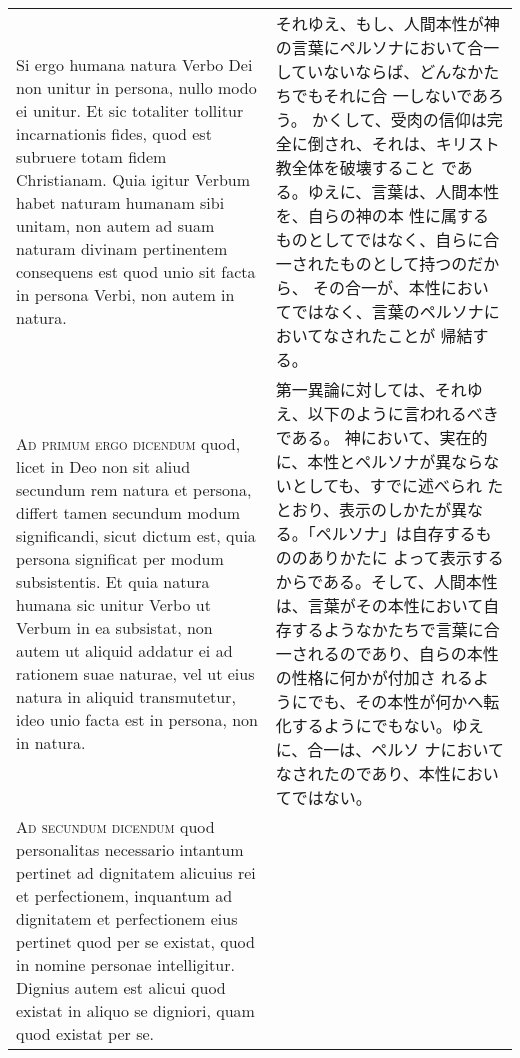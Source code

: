 \documentclass[10pt]{jsarticle} %
\begin{document}
\begin{longtable}{p{21em}p{21em}}
\\




Si ergo humana natura Verbo Dei non unitur in persona, nullo
modo ei unitur. 
Et sic totaliter tollitur incarnationis fides, quod est
subruere totam fidem Christianam. Quia igitur Verbum habet naturam
humanam sibi unitam, non autem ad suam naturam divinam pertinentem
consequens est quod unio sit facta in persona Verbi, non autem in
natura.


&

それゆえ、もし、人間本性が神
 の言葉にペルソナにおいて合一していないならば、どんなかたちでもそれに合
 一しないであろう。
かくして、受肉の信仰は完全に倒され、それは、キリスト教全体を破壊すること
 である。ゆえに、言葉は、人間本性を、自らの神の本
 性に属するものとしてではなく、自らに合一されたものとして持つのだから、
 その合一が、本性においてではなく、言葉のペルソナにおいてなされたことが
 帰結する。

\\



{\scshape Ad primum ergo dicendum} quod, licet in Deo non sit aliud secundum rem
natura et persona, differt tamen secundum modum significandi, sicut
dictum est, quia persona significat per modum subsistentis. Et quia
natura humana sic unitur Verbo ut Verbum in ea subsistat, non autem ut
aliquid addatur ei ad rationem suae naturae, vel ut eius natura in
aliquid transmutetur, ideo unio facta est in persona, non in natura.


&

第一異論に対しては、それゆえ、以下のように言われるべきである。
神において、実在的に、本性とペルソナが異ならないとしても、すでに述べられ
 たとおり、表示のしかたが異なる。「ペルソナ」は自存するもののありかたに
 よって表示するからである。そして、人間本性は、言葉がその本性において自
 存するようなかたちで言葉に合一されるのであり、自らの本性の性格に何かが付加さ
 れるようにでも、その本性が何かへ転化するようにでもない。ゆえに、合一は、ペルソ
 ナにおいてなされたのであり、本性においてではない。

\\



{\scshape Ad secundum dicendum} quod personalitas necessario intantum pertinet ad
dignitatem alicuius rei et perfectionem, inquantum ad dignitatem et
perfectionem eius pertinet quod per se existat, quod in nomine personae
intelligitur. Dignius autem est alicui quod existat in aliquo se
digniori, quam quod existat per se. 


\end{longtable}
\end{document}
